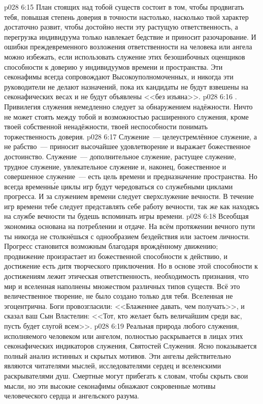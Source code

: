 \vs p028 6:15 \pc План стоящих над тобой существ состоит в том, чтобы продвигать тебя, повышая степень доверия в точности настолько, насколько твой характер достаточно развит, чтобы достойно нести эту растущую ответственность, а перегрузка индивидуума только навлекает бедствие и приносит разочарование. И ошибки преждевременного возложения ответственности на человека или ангела можно избежать, если использовать служение этих безошибочных оценщиков способности к доверию у индивидуумов времени и пространства. Эти секонафимы всегда сопровождают Высокоуполномоченных, и никогда эти руководители не делают назначений, пока их кандидаты не будут взвешены на секонафических весах и не будут объявлены <<без изъяна>>.
\vs p028 6:16 . Привилегия служения немедленно следует за обнаружением надёжности. Ничто не может стоять между тобой и возможностью расширенного служения, кроме твоей собственной ненадёжности, твоей неспособности понимать торжественность доверия.
\vs p028 6:17 Служение~--- целеустремлённое служение, а не рабство~--- приносит высочайшее удовлетворение и выражает божественное достоинство. Служение~--- дополнительное служение, растущее служение, трудное служение, увлекательное служение и, наконец, божественное и совершенное служение~--- есть цель времени и предназначение пространства. Но всегда временн\'ые циклы игр будут чередоваться со служебными циклами прогресса. И за служением времени следует сверхслужение вечности. В течение игр времени тебе следует представлять себе работу вечности, так же как находясь на службе вечности ты будешь вспоминать игры времени.
\vs p028 6:18 \pc Всеобщая экономика основана на потреблении и отдаче. На всём протяжении вечного пути ты никогда не столкнёшься с однообразием бездействия или застоем личности. Прогресс становится возможным благодаря врождённому движению; продвижение произрастает из божественной способности к действию, и достижение есть дитя творческого приключения. Но в основе этой способности к достижениям лежит этическая ответственность, необходимость признания, что мир и вселенная наполнены множеством различных типов существ. Всё это величественное творение,  не было создано только для тебя. Вселенная не эгоцентрична. Боги провозгласили: <<Блаженнее давать, чем получать>>, и сказал ваш Сын Властелин: <<Тот, кто желает быть величайшим среди вас, пусть будет слугой всем>>.
\vs p028 6:19 \pc Реальная природа любого служения, исполняемого человеком или ангелом, полностью раскрывается в лицах этих секонафических индикаторов служения, Святостей Служения. Ясно показывается полный анализ истинных и скрытых мотивов. Эти ангелы действительно являются читателями мыслей, исследователями сердец и вселенскими раскрывателями душ. Смертные могут прибегать к словам, чтобы скрыть свои мысли, но эти высокие секонафимы обнажают сокровенные мотивы человеческого сердца и ангельского разума.
